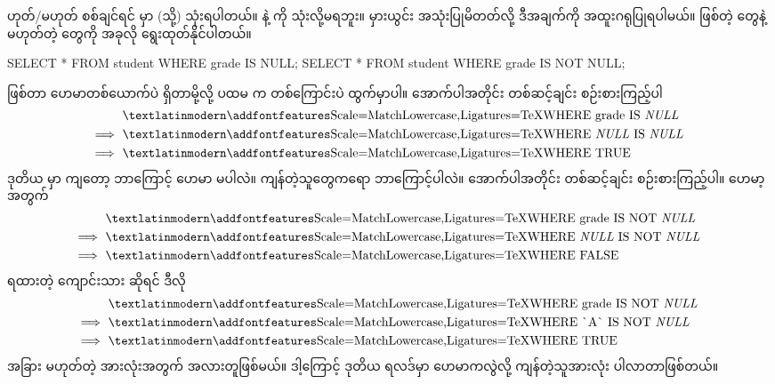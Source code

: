  ဟုတ်/မဟုတ် စစ်ချင်ရင်  မှာ  (သို့)   သုံးရပါတယ်။ \fCode{=} နဲ့ \fCode{<>} ကို သုံးလို့မရဘူး။ မှားယွင်း အသုံးပြုမိတတ်လို့ ဒီအချက်ကို အထူးဂရုပြုရပါမယ်။   ဖြစ်တဲ့  တွေနဲ့  မဟုတ်တဲ့  တွေကို အခုလို ရွေးထုတ်နိုင်ပါတယ်။
%
\begin{sql}
SELECT * FROM student WHERE grade IS NULL;
SELECT * FROM student WHERE grade IS NOT NULL;
\end{sql}
%
  ဖြစ်တာ ဟေမာတစ်ယောက်ပဲ ရှိတာမို့လို့ ပထမ  က  တစ်ကြောင်းပဲ ထွက်မှာပါ။ အောက်ပါအတိုင်း တစ်ဆင့်ချင်း စဉ်းစားကြည့်ပါ
\begin{align*}
    &\text{\fEn{WHERE grade IS \textit{NULL}}}\\
\implies &\text{\fEn{WHERE \textit{NULL} IS \textit{NULL}}}\\
\implies &\text{\fEn{WHERE TRUE}}\\
\end{align*}
ဒုတိယ  မှာ ကျတော့ ဘာကြောင့် ဟေမာ မပါလဲ။ ကျန်တဲ့သူတွေကရော ဘာကြောင့်ပါလဲ။ အောက်ပါအတိုင်း တစ်ဆင့်ချင်း စဉ်းစားကြည့်ပါ။ ဟေမာ့  အတွက်%
%
\begin{align*}
    &\text{\fEn{WHERE grade IS NOT \textit{NULL}}}\\
\implies &\text{\fEn{WHERE \textit{NULL} IS NOT \textit{NULL}}}\\
\implies &\text{\fEn{WHERE FALSE}}\\
\end{align*}
 ရထားတဲ့ ကျောင်းသား  ဆိုရင် ဒီလို 
\begin{align*}
    &\text{\fEn{WHERE grade IS NOT \textit{NULL}}}\\
\implies &\text{\fEn{WHERE \`{}A\`{} IS NOT \textit{NULL}}}\\
\implies &\text{\fEn{WHERE TRUE}}\\
\end{align*}
အခြား  မဟုတ်တဲ့  အားလုံးအတွက် အလားတူဖြစ်မယ်။ ဒါ့ကြောင့် ဒုတိယ  ရလဒ်မှာ ဟေမာကလွဲလို့ ကျန်တဲ့သူအားလုံး ပါလာတာဖြစ်တယ်။

